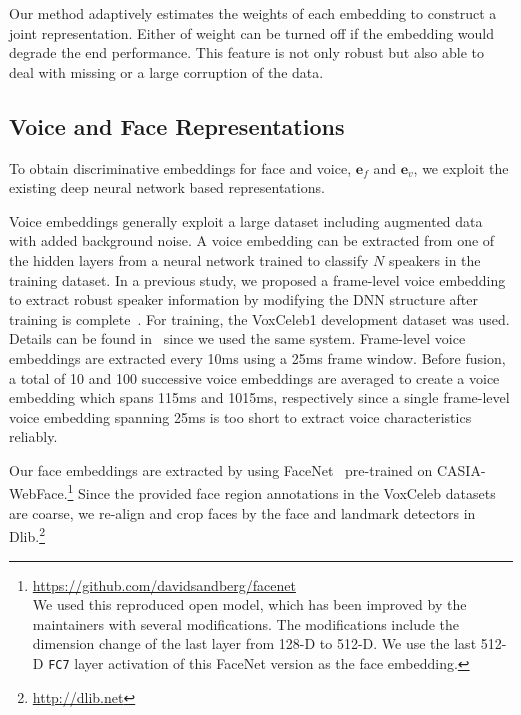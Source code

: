 \documentclass{article}
\begin{document}
Our method adaptively estimates the weights of each embedding to construct a joint representation. Either of weight can be turned off if the embedding would degrade the end performance.
This feature is not only robust but also able to deal with missing or a large corruption of the data.

\subsection{Voice and Face Representations}
To obtain discriminative embeddings for face and voice, $\mathbf{e}_f$ and $\mathbf{e}_v$, 
we exploit the existing deep neural network based representations.

Voice embeddings generally exploit a large dataset including augmented data with added background noise. 
A voice embedding can be extracted from one of the hidden layers from a neural network trained to classify $N$ speakers in the training dataset. In a previous study, we proposed a frame-level voice embedding to extract robust speaker information by modifying the DNN structure after training is complete~\cite{Shon2018frame}. For training, the VoxCeleb1 development dataset was used. 
Details can be found in~\cite{Shon2018frame} since we used the same system.
Frame-level voice embeddings are extracted every 10ms using a 25ms frame window. 
Before fusion, a total of 10 and 100 successive voice embeddings are averaged to create a voice embedding which spans 115ms and 1015ms, respectively since a single frame-level voice embedding spanning 25ms is too short to extract voice characteristics reliably. 

Our face embeddings are extracted by using  FaceNet~\cite{Schroff2015} pre-trained on CASIA-WebFace.\footnote{\url{https://github.com/davidsandberg/facenet}\\ We used this reproduced open model, which has been improved by the maintainers with several modifications.
The modifications include the dimension change of the last layer from 128-D to 512-D. We use the last 512-D \texttt{FC7} layer activation of this FaceNet version as the face embedding.}
Since the provided face region annotations in the VoxCeleb datasets are coarse, 
we re-align and crop faces by the face and landmark detectors in Dlib.\footnote{\url{http://dlib.net}}
\end{document}
